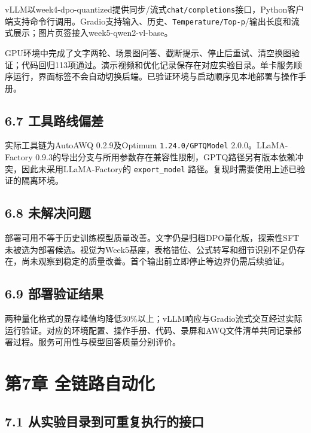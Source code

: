 \documentclass[UTF8,fontset=fandol,a4paper,11pt]{ctexart}
\begin{document}
{vLLM以week4-dpo-quantized提供同步/流式\nolinkurl{chat/completions}接口，Python客户端支持命令行调用。Gradio支持输入、历史、\nolinkurl{Temperature/Top-p}/输出长度和流式展示；图片页签接入week5-qwen2-vl-base。}

GPU环境中完成了文字两轮、场景图问答、截断提示、停止后重试、清空换图验证；代码回归113项通过。演示视频和优化记录保存在对应实验目录。单卡服务顺序运行，界面标签不会自动切换后端。已验证环境与启动顺序见本地部署与操作手册。

\subsection{6.7 工具路线偏差}\label{ux5de5ux5177ux8defux7ebfux504fux5dee}

实际工具链为AutoAWQ 0.2.9及Optimum {\nolinkurl{1.24.0/GPTQModel}}
2.0.0。LLaMA-Factory
0.9.3的导出分支与所用参数存在兼容性限制，GPTQ路径另有版本依赖冲突，因此未采用LLaMA-Factory的
\nolinkurl{export_model} 路径。复现时需要使用上述已验证的隔离环境。

\subsection{6.8 未解决问题}\label{ux672aux89e3ux51b3ux95eeux9898}

部署可用不等于历史训练模型质量改善。文字仍是归档DPO量化版，探索性SFT未被选为部署候选。视觉为Week5基座，表格错位、公式转写和细节识别不足仍存在，尚未观察到稳定的质量改善。首个输出前立即停止等边界仍需后续验证。

\subsection{6.9 部署验证结果}\label{ux90e8ux7f72ux9a8cux8bc1ux7ed3ux679c}

两种量化格式的显存峰值均降低30\%以上；vLLM响应与Gradio流式交互经过实际运行验证。对应的环境配置、操作手册、代码、录屏和AWQ文件清单共同记录部署过程。服务可用性与模型回答质量分别评价。

\section{第7章
全链路自动化}\label{ux7b2c7ux7ae0-ux5168ux94feux8defux81eaux52a8ux5316}

\subsection{7.1 从实验目录到可重复执行的接口}\label{ux4eceux5b9eux9a8cux76eeux5f55ux5230ux53efux91cdux590dux6267ux884cux7684ux63a5ux53e3}
\end{document}
